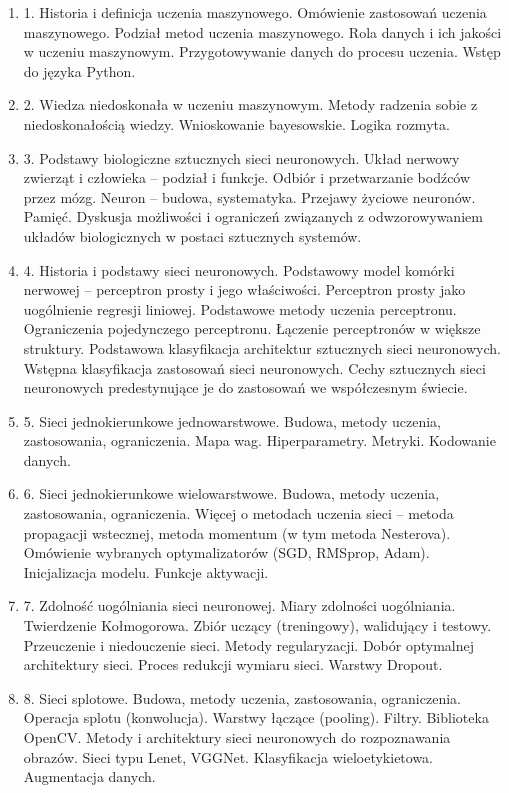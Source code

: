 \documentclass[12pt, a4paper]{article}
\begin{document}
\begin{enumerate}
  \item 1.  Historia i definicja uczenia maszynowego. Omówienie zastosowań uczenia maszynowego. Podział metod uczenia maszynowego. Rola danych i ich jakości w uczeniu maszynowym. Przygotowywanie danych do procesu uczenia. Wstęp do języka Python.
  \item 2.  Wiedza niedoskonała w uczeniu maszynowym. Metody radzenia sobie z niedoskonałością wiedzy. Wnioskowanie bayesowskie. Logika rozmyta.
  \item 3. Podstawy biologiczne sztucznych sieci neuronowych. Układ nerwowy zwierząt i człowieka –  podział i funkcje. Odbiór i przetwarzanie bodźców przez mózg. Neuron – budowa, systematyka. Przejawy życiowe neuronów. Pamięć.  Dyskusja możliwości i ograniczeń związanych z odwzorowywaniem układów biologicznych w postaci sztucznych systemów.
  \item 4.  Historia i podstawy sieci neuronowych. Podstawowy model komórki nerwowej – perceptron prosty i jego właściwości. Perceptron prosty jako uogólnienie regresji liniowej. Podstawowe metody uczenia perceptronu. Ograniczenia pojedynczego perceptronu. Łączenie perceptronów w większe struktury. Podstawowa klasyfikacja architektur sztucznych sieci neuronowych. Wstępna klasyfikacja zastosowań sieci neuronowych. Cechy sztucznych sieci neuronowych predestynujące je do zastosowań we współczesnym świecie.
  \item 5.  Sieci jednokierunkowe jednowarstwowe. Budowa, metody uczenia, zastosowania, ograniczenia. Mapa wag.  Hiperparametry. Metryki. Kodowanie danych.
  \item 6. Sieci jednokierunkowe wielowarstwowe. Budowa, metody uczenia, zastosowania, ograniczenia. Więcej o metodach uczenia sieci – metoda propagacji wstecznej, metoda momentum (w tym metoda Nesterova). Omówienie wybranych optymalizatorów (SGD, RMSprop, Adam). Inicjalizacja modelu. Funkcje aktywacji.
  \item 7.  Zdolność uogólniania sieci neuronowej. Miary zdolności uogólniania. Twierdzenie Kołmogorowa. Zbiór uczący (treningowy), walidujący i testowy. Przeuczenie i niedouczenie sieci. Metody regularyzacji. Dobór optymalnej architektury sieci. Proces redukcji wymiaru sieci. Warstwy Dropout.
  \item 8. Sieci splotowe. Budowa, metody uczenia, zastosowania, ograniczenia. Operacja splotu (konwolucja). Warstwy łączące (pooling). Filtry.  Biblioteka OpenCV. Metody i architektury sieci neuronowych do rozpoznawania obrazów. Sieci typu Lenet, VGGNet. Klasyfikacja wieloetykietowa. Augmentacja danych.

\end{enumerate}
\end{document}
